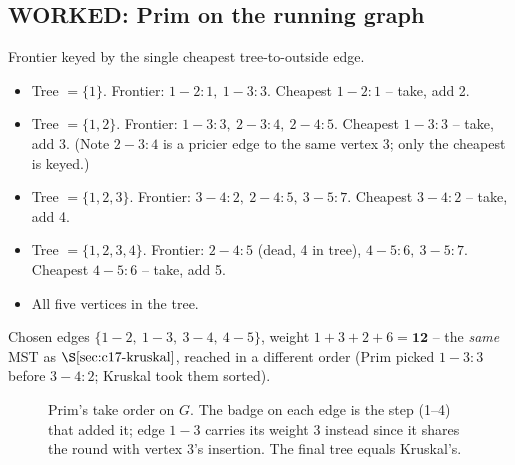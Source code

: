 \subsection{WORKED: Prim on the running graph}

\begin{tracebox}
Frontier keyed by the single cheapest tree-to-outside edge.
\begin{itemize}[nosep,leftmargin=1.4em]
  \item Tree \(=\{1\}\). Frontier: \(1\!-\!2{:}1,\ 1\!-\!3{:}3\). Cheapest
        \(1\!-\!2{:}1\) -- take, add 2.
  \item Tree \(=\{1,2\}\). Frontier: \(1\!-\!3{:}3,\ 2\!-\!3{:}4,\ 2\!-\!4{:}5\).
        Cheapest \(1\!-\!3{:}3\) -- take, add 3. (Note \(2\!-\!3{:}4\) is a
        pricier edge to the same vertex 3; only the cheapest is keyed.)
  \item Tree \(=\{1,2,3\}\). Frontier: \(3\!-\!4{:}2,\ 2\!-\!4{:}5,\ 3\!-\!5{:}7\).
        Cheapest \(3\!-\!4{:}2\) -- take, add 4.
  \item Tree \(=\{1,2,3,4\}\). Frontier: \(2\!-\!4{:}5\) (dead, 4 in tree),
        \(4\!-\!5{:}6,\ 3\!-\!5{:}7\). Cheapest \(4\!-\!5{:}6\) -- take, add 5.
  \item All five vertices in the tree.
\end{itemize}
Chosen edges \(\{1\!-\!2,\ 1\!-\!3,\ 3\!-\!4,\ 4\!-\!5\}\), weight
\(1+3+2+6=\mathbf{12}\) -- the \emph{same} MST as \(\secref{c17-kruskal}\), reached
in a different order (Prim picked \(1\!-\!3{:}3\) before \(3\!-\!4{:}2\); Kruskal
took them sorted).
\end{tracebox}

\begin{figure}[H]
\centering
{}
\caption{Prim's take order on \(G\).  The badge on each edge is the step (1--4)
that added it; edge \(1\!-\!3\) carries its weight \(3\) instead since it shares
the round with vertex 3's insertion.  The final tree equals Kruskal's.}
\label{fig:c17-prim-trace}
\end{figure}

